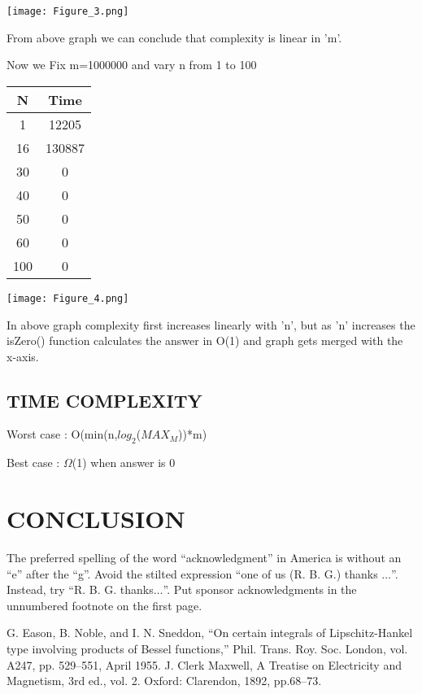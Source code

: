 \documentclass[conference]{IEEEtran}
\begin{document}
\texttt{[image: Figure\_3.png]}

From above graph we can conclude that complexity is linear in 'm'.

Now we Fix m=1000000 and vary n from 1 to 100

\begin{center}
   \begin{tabular}{|c|c|}
   \hline
   N & Time \\
   \hline\hline
    1 & 12205 \\
    \hline
    16 & 130887 \\
    \hline
    30 & 0 \\
    \hline
    40 & 0 \\
    \hline
    50 & 0 \\
    \hline
    60 & 0 \\
    \hline
    100 & 0 \\
    \hline
    \end{tabular} 
\end{center}

\texttt{[image: Figure\_4.png]}

In above graph complexity first increases linearly with 'n', but as 'n' increases the isZero() function calculates the answer in O(1) and graph gets merged with the x-axis. 

\subsection{TIME COMPLEXITY}

Worst case : O(min(n,$log_2$($MAX_M$))*m)

Best case  : $\Omega$(1) when answer is 0

\section*{CONCLUSION}

The preferred spelling of the word ``acknowledgment'' in America is without 
an ``e'' after the ``g''. Avoid the stilted expression ``one of us (R. B. 
G.) thanks $\ldots$''. Instead, try ``R. B. G. thanks$\ldots$''. Put sponsor 
acknowledgments in the unnumbered footnote on the first page.

\begin{thebibliography}{00}
 G. Eason, B. Noble, and I. N. Sneddon, ``On certain integrals of Lipschitz-Hankel type involving products of Bessel functions,'' Phil. Trans. Roy. Soc. London, vol. A247, pp. 529--551, April 1955.
 J. Clerk Maxwell, A Treatise on Electricity and Magnetism, 3rd ed., vol. 2. Oxford: Clarendon, 1892, pp.68--73.
\end{thebibliography}
\end{document}
